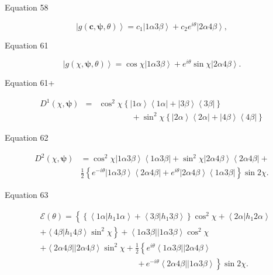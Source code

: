 \documentclass{article}
\begin{document}
Equation 58

\[
\left\vert g\left( \boldsymbol{c},\boldsymbol{\psi },\theta \right)
\right\rangle =c_{1}\left\vert 1\alpha 3\beta \right\rangle +c_{2}e^{i\theta
}\left\vert 2\alpha 4\beta \right\rangle ,
\]

Equation 61

\[
\left\vert g\left( \chi ,\boldsymbol{\psi },\theta \right) \right\rangle
=\cos \chi \left\vert 1\alpha 3\beta \right\rangle +e^{i\theta }\sin \chi
\left\vert 2\alpha 4\beta \right\rangle .
\]

Equation 61+

\begin{eqnarray*}
D^{1}\left( \chi ,\boldsymbol{\psi }\right)  &=&\cos ^{2}\chi \left\{
\left\vert 1\alpha \right\rangle \left\langle 1\alpha \right\vert
+\left\vert 3\beta \right\rangle \left\langle 3\beta \right\vert \right\}  \\
&&\qquad \qquad +\sin ^{2}\chi \left\{ \left\vert 2\alpha \right\rangle
\left\langle 2\alpha \right\vert +\left\vert 4\beta \right\rangle
\left\langle 4\beta \right\vert \right\} 
\end{eqnarray*}

Equation 62

\begin{align*}
D^{2}\left( \chi ,\boldsymbol{\psi }\right) & =\cos ^{2}\chi \left\vert
1\alpha 3\beta \right\rangle \left\langle 1\alpha 3\beta \right\vert +\sin
^{2}\chi \left\vert 2\alpha 4\beta \right\rangle \left\langle 2\alpha 4\beta
\right\vert + \\
& \frac{1}{2}\left\{ e^{-i\theta }\left\vert 1\alpha 3\beta \right\rangle
\left\langle 2\alpha 4\beta \right\vert +e^{i\theta }\left\vert 2\alpha
4\beta \right\rangle \left\langle 1\alpha 3\beta \right\vert \right\} \sin
2\chi .
\end{align*}

Equation 63

\begin{align*}
& \mathcal{E}\left( \theta \right) =\left\{ \left\{ \left\langle 1\alpha
\left\vert h_{1}1\alpha \right. \right\rangle +\left\langle 3\beta
\left\vert h_{1}3\beta \right. \right\rangle \right\} \cos ^{2}\chi
+\left\langle 2\alpha \left\vert h_{1}2\alpha \right. \right\rangle \right. 
\\
& \left. +\left\langle 4\beta \left\vert h_{1}4\beta \right. \right\rangle
\sin ^{2}\chi \right\} +\left\langle 1\alpha 3\beta \right\vert \left\vert
1\alpha 3\beta \right\rangle \cos ^{2}\chi  \\
& +\left\langle 2\alpha 4\beta \right\vert \left\vert 2\alpha 4\beta
\right\rangle \sin ^{2}\chi +\frac{1}{2}\left\{ e^{i\theta }\left\langle
1\alpha 3\beta \right\vert \left\vert 2\alpha 4\beta \right\rangle \right. 
\\
& \qquad \qquad \qquad \qquad \qquad \qquad \left. +\,e^{-i\theta
}\left\langle 2\alpha 4\beta \right\vert \left\vert 1\alpha 3\beta
\right\rangle \right\} \sin 2\chi .
\end{align*}
\end{document}
